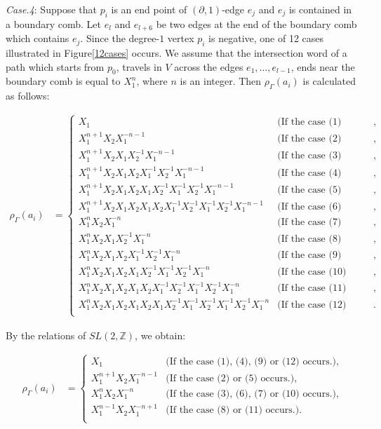 \documentclass{amsart}
\theoremstyle{plain}
\theoremstyle{definition}
\begin{document}
{\it Case.4}: Suppose that $p_i$ is an end point of $(\partial,1)$-edge $e_j$ and $e_j$ is contained in a boundary comb. 
Let $e_l$ and $e_{l+6}$ be two edges at the end of the boundary comb which contains $e_{j}$. 
Since the degree-$1$ vertex $p_i$ is negative, one of 12 cases illustrated in Figure\ref{12cases} occurs. 
We assume that the intersection word of a path which starts from $p_0$, travels in $V$ across the edges $e_1,\ldots,e_{l-1}$, ends near the boundary comb is equal to $X_1^n$, where $n$ is an integer. 
Then $\rho_\Gamma(a_i)$ is calculated as follows: 

\begin{align*}
\rho_\Gamma(a_i) & =\begin{cases}
X_1 & \text{(If the case (1) occurs.)}, \\
X_1^{n+1}X_2X_1^{-n-1} & \text{(If the case (2) occurs.)}, \\
X_1^{n+1}X_2X_1X_2^{-1}X_1^{-n-1} & \text{(If the case (3) occurs.)}, \\
X_1^{n+1}X_2X_1X_2X_1^{-1}X_2^{-1}X_1^{-n-1} & \text{(If the case (4) occurs.)}, \\
X_1^{n+1}X_2X_1X_2X_1X_2^{-1}X_1^{-1}X_2^{-1}X_1^{-n-1} & \text{(If the case (5) occurs.)}, \\
X_1^{n+1}X_2X_1X_2X_1X_2X_1^{-1}X_2^{-1}X_1^{-1}X_2^{-1}X_1^{-n-1} & \text{(If the case (6) occurs.)}, \\
X_1^{n}X_2X_1^{-n} & \text{(If the case (7) occurs.)}, \\
X_1^{n}X_2X_1X_2^{-1}X_1^{-n} & \text{(If the case (8) occurs.)}, \\
X_1^{n}X_2X_1X_2X_1^{-1}X_2^{-1}X_1^{-n} & \text{(If the case (9) occurs.)}, \\
X_1^{n}X_2X_1X_2X_1X_2^{-1}X_1^{-1}X_2^{-1}X_1^{-n} & \text{(If the case (10) occurs.)}, \\
X_1^{n}X_2X_1X_2X_1X_2X_1^{-1}X_2^{-1}X_1^{-1}X_2^{-1}X_1^{-n} & \text{(If the case (11) occurs.)}, \\
X_1^{n}X_2X_1X_2X_1X_2X_1X_2^{-1}X_1^{-1}X_2^{-1}X_1^{-1}X_2^{-1}X_1^{-n} & \text{(If the case (12) occurs.)}. \\
\end{cases}
\end{align*}

By the relations of $SL(2,\mathbb{Z})$, we obtain: 

\begin{align*}
\rho_\Gamma(a_i) & =\begin{cases}
X_1 & \text{(If the case (1), (4), (9) or (12) occurs.)}, \\
X_1^{n+1}X_2X_1^{-n-1} & \text{(If the case (2) or (5) occurs.)}, \\
X_1^nX_2X_1^{-n} & \text{(If the case (3), (6), (7) or (10) occurs.)}, \\
X_1^{n-1}X_2X_1^{-n+1} & \text{(If the case (8) or (11) occurs.)}. \\
\end{cases}
\end{align*}
\end{document}
